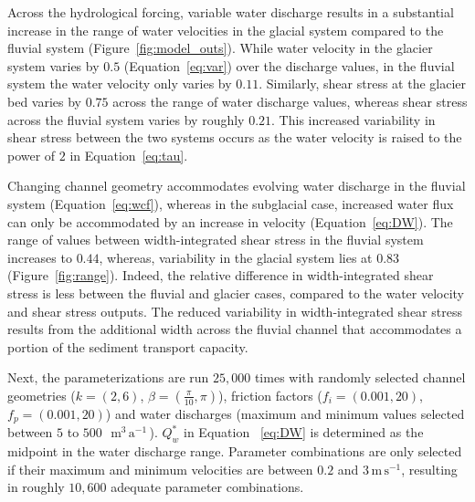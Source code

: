 \documentclass[11pt]{article}
\newcommand{\mmma}{$\,\mathrm{m^3\, a^{-1}}$\,}
\newcommand{\unit}[1]{$\mathrm{#1}$}
\begin{document}
\begin{spacing}{1}
  Across the hydrological forcing, variable water discharge results in a substantial increase in the range of water velocities in the glacial system compared to the fluvial system (Figure~\ref{fig:model_outs}).
  While water velocity in the glacier system varies by  $0.5$ (Equation~\ref{eq:var}) over the discharge values, in the fluvial system the water velocity only varies by $0.11$.
  Similarly, shear stress at the glacier bed varies by $0.75$ across the range of water discharge values, whereas shear stress across the fluvial system varies by roughly $0.21$. This increased variability  in shear stress between the two systems occurs as the water velocity is raised to the power of $2$ in Equation~\ref{eq:tau}. 
  
  Changing channel geometry accommodates evolving water discharge in the fluvial system (Equation~\ref{eq:wcf}), whereas in the subglacial case, increased water flux can only be accommodated by an increase in velocity (Equation~\ref{eq:DW}).
  The range of values between width-integrated shear stress in the fluvial system increases to $0.44$, whereas, variability in the glacial system lies at $0.83$ (Figure~\ref{fig:range}).
  Indeed, the relative  difference in width-integrated shear stress is less between the fluvial and glacier cases, compared to the water velocity and shear stress outputs.
  The reduced variability in width-integrated shear stress results from the additional width across the fluvial channel that accommodates a portion of the sediment transport capacity.
  
  Next, the parameterizations are run $25,000$ times with randomly selected channel geometries ($k=(2,6)$, $\beta=(\frac{\pi}{10},\pi)$), friction factors ($f_i=(0.001,20)$, $f_p=(0.001,20)$) and water discharges (maximum and minimum values selected between $5$ to $500$ \,\mmma). $Q_w^*$ in Equation ~\ref{eq:DW} is determined as the midpoint in the water discharge range. Parameter combinations are only selected if their maximum and minimum velocities are between $0.2$ and $3$\,\unit{m}\,\unit{s}$^{-1}$, resulting in roughly $10,600$ adequate parameter combinations. 
  

\end{spacing}
\end{document}
